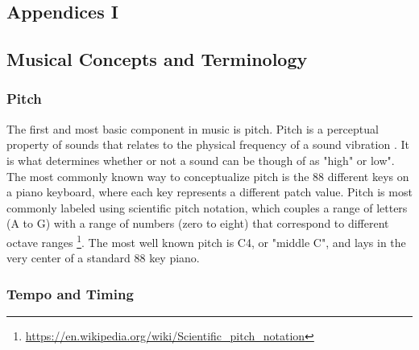 \appendix

	
\begin{appendices}
\chapter{Appendices I} \label{app:appendix_one}
\section{Musical Concepts and Terminology} \label{ase:app_one_sect_1}

\subsection{Pitch}

The first and most basic component in music is pitch. Pitch is a perceptual property of sounds that relates to the physical frequency of a sound vibration \cite{klapuri2006introduction}. It is what determines whether or not a sound can be though of as "high" or low". The most commonly known way to conceptualize pitch is the 88 different keys on a piano keyboard, where each key represents a different patch value. Pitch is most commonly labeled using scientific pitch notation, which couples a range of letters (A to G) with a range of numbers (zero to eight) that correspond to different octave ranges \footnote{\url{https://en.wikipedia.org/wiki/Scientific_pitch_notation}}. The most well known pitch is C4, or "middle C", and lays in the very center of a standard 88 key piano. 

\subsection{Tempo and Timing}


\end{appendices}
